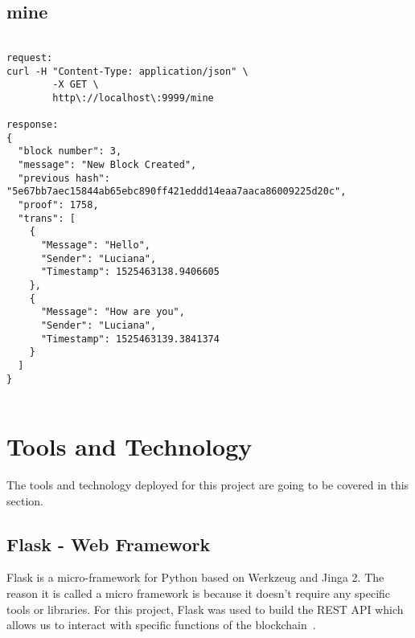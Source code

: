 \subsection{mine}

\bigskip
\noindent
\begin{footnotesize}
\begin{verbatim}

request:
curl -H "Content-Type: application/json" \
        -X GET \
        http\://localhost\:9999/mine
        
response:
{
  "block number": 3,
  "message": "New Block Created",
  "previous hash": "5e67bb7aec15844ab65ebc890ff421eddd14eaa7aaca86009225d20c",
  "proof": 1758,
  "trans": [
    {
      "Message": "Hello",
      "Sender": "Luciana",
      "Timestamp": 1525463138.9406605
    },
    {
      "Message": "How are you",
      "Sender": "Luciana",
      "Timestamp": 1525463139.3841374
    }
  ]
}


\end{verbatim}
\end{footnotesize}

\section{Tools and Technology}

The tools and technology deployed for this project are going to be covered in 
this section.

\subsection{Flask - Web Framework}

Flask is a micro-framework for Python based on Werkzeug and Jinga
2. The reason it is called a micro framework is because it doesn't
require any specific tools or libraries. For this project, Flask was
used to build the REST API which allows us to interact with specific
functions of the
blockchain~\cite{hid-sp18-414-www-flask-python-microframewor}.

